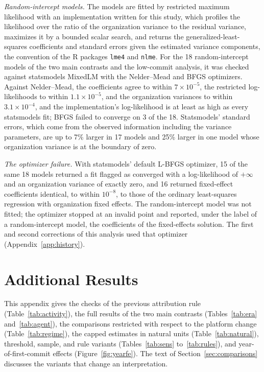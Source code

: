 \documentclass[acmsmall,screen,review,anonymous]{acmart}
\begin{document}
\textit{Random-intercept models.} The models are fitted by restricted maximum likelihood with an implementation written for this study, which profiles the likelihood over the ratio of the organization variance to the residual variance, maximizes it by a bounded scalar search, and returns the generalized-least-squares coefficients and standard errors given the estimated variance components, the convention of the R packages \texttt{lme4} and \texttt{nlme}. For the 18 random-intercept models of the two main contrasts and the low-commit analysis, it was checked against statsmodels MixedLM with the Nelder--Mead and BFGS optimizers. Against Nelder--Mead, the coefficients agree to within $7 \times 10^{-5}$, the restricted log-likelihoods to within $1.1 \times 10^{-5}$, and the organization variances to within $3.1 \times 10^{-4}$, and the implementation's log-likelihood is at least as high as every statsmodels fit; BFGS failed to converge on 3 of the 18. Statsmodels' standard errors, which come from the observed information including the variance parameters, are up to 7\% larger in 17 models and 25\% larger in one model whose organization variance is at the boundary of zero.

\textit{The optimizer failure.} With statsmodels' default L-BFGS optimizer, 15 of the same 18 models returned a fit flagged as converged with a log-likelihood of $+\infty$ and an organization variance of exactly zero, and 16 returned fixed-effect coefficients identical, to within $10^{-8}$, to those of the ordinary least-squares regression with organization fixed effects. The random-intercept model was not fitted; the optimizer stopped at an invalid point and reported, under the label of a random-intercept model, the coefficients of the fixed-effects solution. The first and second corrections of this analysis used that optimizer (Appendix~\ref{app:history}).

\FloatBarrier
\section{Additional Results}
\label{app:sens}

This appendix gives the checks of the previous attribution rule (Table~\ref{tab:activity}), the full results of the two main contrasts (Tables~\ref{tab:era} and~\ref{tab:agent}), the comparisons restricted with respect to the platform change (Table~\ref{tab:regime}), the capped estimates in natural units (Table~\ref{tab:natural}), threshold, sample, and rule variants (Tables~\ref{tab:sens} to~\ref{tab:rules}), and year-of-first-commit effects (Figure~\ref{fig:yearfe}). The text of Section~\ref{sec:comparisons} discusses the variants that change an interpretation.
\end{document}
